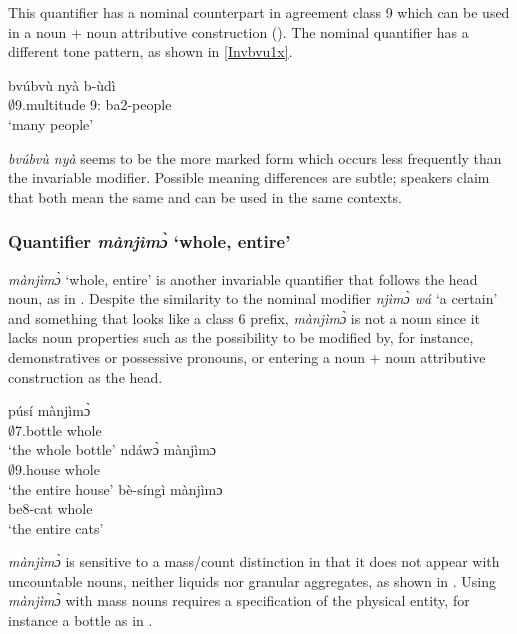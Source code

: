 This quantifier has a nominal counterpart in agreement class 9 which can be used in a noun + noun attributive construction (). The nominal quantifier has a different tone pattern, as shown in \ref{Invbvu1x}. 

\ea \label{Invbvu1x}
 \gll   bvúbvù nyà b-ùdì \\
        $\emptyset$9.multitude 9:{\ATT} ba2-people  \\
    \trans `many people'
\z    

{\itshape bvúbvù nyà} seems to be the more marked form which occurs less frequently than the invariable modifier. Possible meaning differences are subtle; speakers claim that both mean the same and can be used in the same contexts.





\subsubsection{Quantifier {\itshape mànjìmɔ̀} `whole, entire'}
\label{sec:mandjimo}

{\itshape mànjìmɔ̀} `whole, entire' is another invariable quantifier that follows the head noun, as in . Despite the similarity to the nominal modifier {\itshape njìmɔ̀ wá} `a certain' and something that looks like a class 6 prefix, {\itshape mànjìmɔ̀} is not a noun since it lacks noun properties such as the possibility to be modified by, for instance, demonstratives or possessive pronouns, or entering a noun + noun attributive construction as the head.


\ea \label{whole}
  \ea  \label{whole1}
  \gll     púsí mànjìmɔ̀\\
                $\emptyset$7.bottle whole \\
    \trans `the whole bottle'
\ex\label{whole2}
 \gll     ndáwɔ̀ mànjìmɔ  \\
             $\emptyset$9.house whole  \\
    \trans `the entire house'
\ex\label{whole3}
 \gll   bè-síngì mànjìmɔ  \\
             be8-cat whole   \\
    \trans `the entire cats'
\z
\z

{\itshape mànjìmɔ̀} is sensitive to a mass/count distinction in that it does not appear with uncountable nouns, neither liquids nor granular aggregates, as shown in . Using {\itshape mànjìmɔ̀} with mass nouns requires a specification of the physical entity, for instance a bottle as in .


